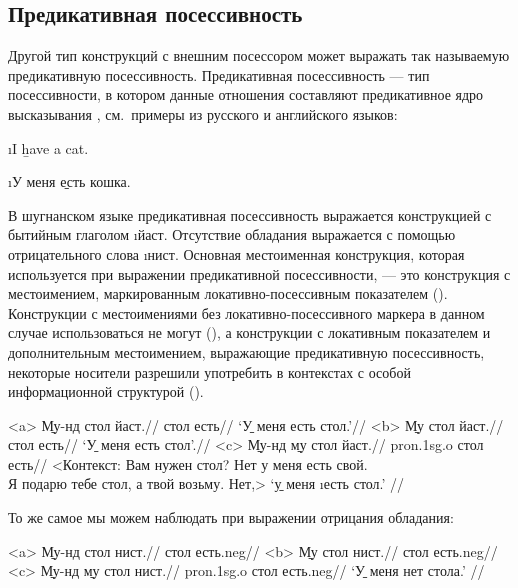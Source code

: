 \subsection{Предикативная посессивность}

Другой тип конструкций с внешним посессором может выражать так называемую предикативную посессивность. Предикативная посессивность — тип посессивности, в котором данные отношения составляют предикативное ядро высказывания \parencites{stassen2001}{stassen2013}, см.~примеры из русского и английского языков:

\pagebreak[4]

\i{I \b{have} a cat.}
\xe

\i{У меня \b{есть} кошка.}
\xe

В шугнанском языке предикативная посессивность выражается конструкцией с бытийным глаголом \i{йаст}. Отсутствие обладания выражается с помощью отрицательного слова \i{нист}. Основная местоименная конструкция, которая используется при выражении предикативной посессивности, — это конструкция с местоимением, маркированным локативно-посессивным показателем (). Конструкции с местоимениями без локативно-посессивного маркера в данном случае использоваться не могут (), а конструкции с локативным показателем и дополнительным местоимением, выражающие предикативную посессивность, некоторые носители разрешили употребить в контекстах с особой информационной структурой ().

\a<a> \begingl
\gla \b{Му-нд} стол йаст.//
 стол есть//
\glft ‘\b{У меня} есть стол.’//
\endgl
\a<b> \begingl
\gla \ljudge{*}\b{Му} стол йаст.//
 стол есть//
 ‘\b{У меня} есть стол’.//
\endgl
\a<c> \begingl
\gla {}\b{Му-нд} \b{му} стол йаст.//
 {\sc pron.1sg.o} стол есть//
\glft <Контекст: Вам нужен стол? Нет у меня есть свой.\\
Я подарю тебе стол, а твой возьму. Нет,> ‘\b{у меня} \i{есть} стол.’ \trailingcitation{[элицитация]}//
\endgl \xe

То же самое мы можем наблюдать при выражении отрицания обладания:

\a<a> \begingl
\gla \b{Му-нд} стол нист.//
 стол есть.{\sc neg}//
\endgl
\a<b> \begingl
\gla \ljudge{*}\b{Му} стол нист.//
 стол есть.{\sc neg}//
\endgl
\a<c> \begingl
\gla {}\b{Му-нд} \b{му} стол нист.//
 {\sc pron.1sg.o} стол есть.{\sc neg}//
\glft ‘\b{У меня} нет стола.’ \trailingcitation{[элицитация]}//
\endgl \xe

